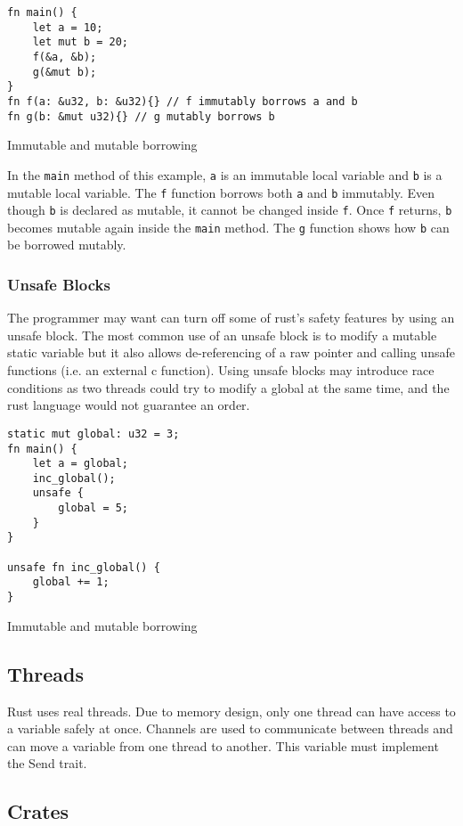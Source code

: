 \begin{code}
\begin{verbatim}
fn main() {
    let a = 10;
    let mut b = 20;
    f(&a, &b);
    g(&mut b);
}
fn f(a: &u32, b: &u32){} // f immutably borrows a and b
fn g(b: &mut u32){} // g mutably borrows b
\end{verbatim}
\caption{Immutable and mutable borrowing}
\end{code}

In the \texttt{main} method of this example, \texttt{a} is an immutable local variable and \texttt{b} is a mutable local variable. The \texttt{f} function borrows both \texttt{a} and \texttt{b} immutably. Even though \texttt{b} is declared as mutable, it cannot be changed inside \texttt{f}. Once \texttt{f} returns, \texttt{b} becomes mutable again inside the \texttt{main} method. The \texttt{g} function shows how \texttt{b} can be borrowed mutably.

\subsubsection{Unsafe Blocks}
The programmer may want can turn off some of rust's safety features by using an unsafe block. The most common use of an unsafe block is to modify a mutable static variable but it also allows de-referencing of a raw pointer and calling unsafe functions (i.e. an external c function). Using unsafe blocks may introduce race conditions as two threads could try to modify a global at the same time, and the rust language would not guarantee an order.

\begin{code}
\begin{verbatim}
static mut global: u32 = 3;
fn main() {
    let a = global;
    inc_global();
    unsafe {
        global = 5;
    }
}

unsafe fn inc_global() {
    global += 1;
}
\end{verbatim}
\caption{Immutable and mutable borrowing}
\end{code}

\subsection{Threads}
Rust uses real threads. Due to memory design, only one thread can have access to a variable safely at once. Channels are used to communicate between threads and can move a variable from one thread to another. This variable must implement the Send trait.

\subsection{Crates}
